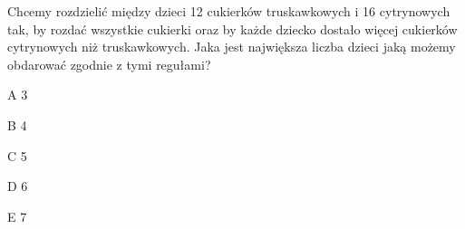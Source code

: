 \begin{tresc}
Chcemy rozdzielić między dzieci 12 cukierków truskawkowych i 16 cytrynowych tak, by rozdać wszystkie cukierki oraz by każde dziecko dostało więcej cukierków cytrynowych niż truskawkowych. Jaka jest największa liczba dzieci jaką możemy obdarować zgodnie z tymi regułami?
\end{tresc}
\begin{wariant}{A} 3 \end{wariant}
\begin{wariant}{B} 4 \end{wariant}
\begin{wariant}{C} 5 \end{wariant}
\begin{wariant}{D} 6 \end{wariant}
\begin{wariant}{E} 7 \end{wariant}
